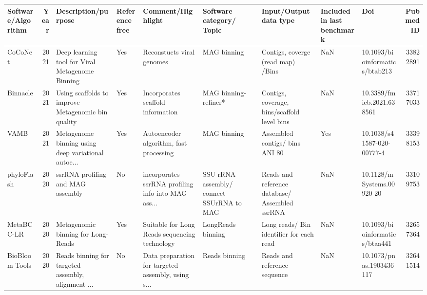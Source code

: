 \begin{tabular}{lrlllllllr}
\toprule
        Software/Algorithm &  Year &                                Description/purpose & Reference free &                                  Comment/Highlight &                  Software category/ Topic &                         Input/Output data type & Included in last benchmark &                            Doi &  PubmedID \\
\midrule
                   CoCoNet &  2021 &    Deep learning tool for Viral Metagenome Binning &            Yes &                          Reconstucts viral genomes &                               MAG binning &              Contigs, coverge (read map) /Bins &                        NaN & 10.1093/bioinformatics/btab213 &  33822891 \\
                  Binnacle &  2021 & Using scaffolds to improve Metagenomic bin quality &            Yes &                  Incorporates scaffold information &                      MAG binning-refiner* &   Contigs, coverage, bins/scaffold level bins  &                        NaN &      10.3389/fmicb.2021.638561 &  33717033 \\
                      VAMB &  2021 & Metagenome binning using deep variational autoe... &            Yes &            Autoencoder algorithm, fast processing  &                               MAG binning &                 Assembled contigs/ bins ANI 80 &                        Yes &     10.1038/s41587-020-00777-4 &  33398153 \\
                phyloFlash &  2020 &                  ssrRNA profiling and MAG assembly &             No & incorporates ssrRNA profiling info into MAG ass... & SSU rRNA assembly/ connect SSUrRNA to MAG & Reads and reference database/ Assembled ssrRNA &                        NaN &      10.1128/mSystems.00920-20 &  33109753 \\
                MetaBCC-LR &  2020 &                 Metagenomic binning for Long-Reads &            Yes &      Suitable for Long Reads sequencing technology &                         LongReads binning &       Long reads/ Bin identifier for each read &                        NaN & 10.1093/bioinformatics/btaa441 &  32657364 \\
            BioBloom Tools &  2020 & Reads binning for targeted assembly, alignment ... &             No & Data preparation for targeted assembly, using s... &                             Reads binning &                   Reads and reference sequence &                        NaN &        10.1073/pnas.1903436117 &  32641514 \\

\end{tabular}
